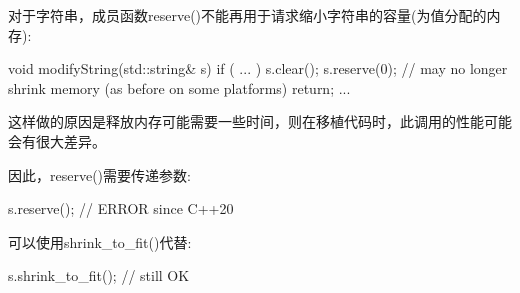 
对于字符串，成员函数reserve()不能再用于请求缩小字符串的容量(为值分配的内存):

\begin{cpp}
void modifyString(std::string& s)
{
	if ( ... ) {
		s.clear();
		s.reserve(0); // may no longer shrink memory (as before on some platforms)
		return;
	}
	...
}
\end{cpp}

这样做的原因是释放内存可能需要一些时间，则在移植代码时，此调用的性能可能会有很大差异。

因此，reserve()需要传递参数:

\begin{cpp}
s.reserve(); // ERROR since C++20
\end{cpp}

可以使用shrink\_to\_fit()代替:

\begin{cpp}
s.shrink_to_fit(); // still OK
\end{cpp}







